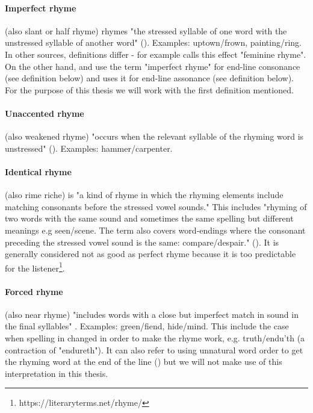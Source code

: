 \paragraph{Imperfect rhyme} (also slant or half rhyme)  rhymes "the stressed syllable of one word with the unstressed syllable of another word" (\cite{bergman2017litcharts}). Examples: uptown/frown, painting/ring. In other sources, definitions differ - for example \cite{literarydevices2020} calls this effect "feminine rhyme".  On the other hand, \cite{oxforddict2008literary} and \cite{britannica} use the term "imperfect rhyme" for end-line consonance (see definition below) and \cite{vanphonological} uses it for end-line assonance (see definition below). For the purpose of this thesis we will work with the first definition mentioned.

\paragraph{Unaccented rhyme} (also weakened rhyme) "occurs when the relevant syllable of the rhyming word is unstressed" (\cite{britannica}). Examples: hammer/carpenter.

\paragraph{Identical rhyme} (also rime riche) is "a kind of rhyme in which the rhyming elements include matching consonants before the stressed vowel sounds." This includes "rhyming of two words with the same sound and sometimes the same spelling but different meanings e.g seen/scene. The term also covers word‐endings where the consonant preceding the stressed vowel sound is the same: compare/despair." (\cite{oxforddict2008literary}). It is generally considered not as good as perfect rhyme because it is too predictable for the listener\footnote{https://literaryterms.net/rhyme/}.
 
\paragraph{Forced rhyme} (also near rhyme) "includes words with a close but imperfect match in sound in the final syllables" \cite{bergman2017litcharts}. Examples: green/fiend, hide/mind. This include the case when spelling in changed in order to make the rhyme work, e.g. truth/endu'th (a contraction of "endureth"). It can also refer to using unnatural word order to get the rhyming word at the end of the line (\cite{bergman2017litcharts}) but we will not make use of this interpretation in this thesis.


